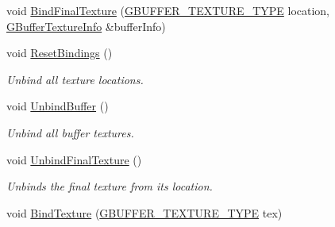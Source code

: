 \begin{DoxyCompactItemize}
\item 
void \mbox{\hyperlink{class_geometry_engine_1_1_geometry_buffer_1_1_g_buffer_a710627a05fa69f6aa98ee6d90ab57e85}{Bind\+Final\+Texture}} (\mbox{\hyperlink{class_geometry_engine_1_1_geometry_buffer_1_1_g_buffer_a718dceafcac1915f7de061108597e1cc}{G\+B\+U\+F\+F\+E\+R\+\_\+\+T\+E\+X\+T\+U\+R\+E\+\_\+\+T\+Y\+PE}} location, \mbox{\hyperlink{class_geometry_engine_1_1_g_buffer_texture_info}{G\+Buffer\+Texture\+Info}} \&buffer\+Info)
\item 
\mbox{\label{class_geometry_engine_1_1_geometry_buffer_1_1_g_buffer_a1ef28cc887dbd56d20ae4df0617b8eb1}} 
void \mbox{\hyperlink{class_geometry_engine_1_1_geometry_buffer_1_1_g_buffer_a1ef28cc887dbd56d20ae4df0617b8eb1}{Reset\+Bindings}} ()
\begin{DoxyCompactList}\small\item\em Unbind all texture locations. \end{DoxyCompactList}\item 
\mbox{\label{class_geometry_engine_1_1_geometry_buffer_1_1_g_buffer_a2c24808c13f616bcc3ca6ed321277e95}} 
void \mbox{\hyperlink{class_geometry_engine_1_1_geometry_buffer_1_1_g_buffer_a2c24808c13f616bcc3ca6ed321277e95}{Unbind\+Buffer}} ()
\begin{DoxyCompactList}\small\item\em Unbind all buffer textures. \end{DoxyCompactList}\item 
\mbox{\label{class_geometry_engine_1_1_geometry_buffer_1_1_g_buffer_a954286e665d76dc77f352923a3c0b191}} 
void \mbox{\hyperlink{class_geometry_engine_1_1_geometry_buffer_1_1_g_buffer_a954286e665d76dc77f352923a3c0b191}{Unbind\+Final\+Texture}} ()
\begin{DoxyCompactList}\small\item\em Unbinds the final texture from its location. \end{DoxyCompactList}\item 
void \mbox{\hyperlink{class_geometry_engine_1_1_geometry_buffer_1_1_g_buffer_a6a2469afe0c79b97d35ba5d2b6a1ae52}{Bind\+Texture}} (\mbox{\hyperlink{class_geometry_engine_1_1_geometry_buffer_1_1_g_buffer_a718dceafcac1915f7de061108597e1cc}{G\+B\+U\+F\+F\+E\+R\+\_\+\+T\+E\+X\+T\+U\+R\+E\+\_\+\+T\+Y\+PE}} tex)

\end{DoxyCompactItemize}
